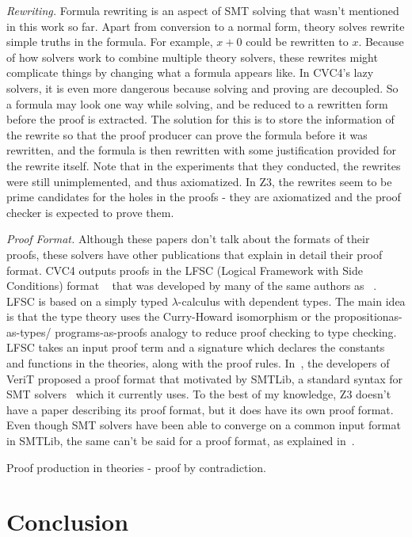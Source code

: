 \documentclass{article}
\begin{document}
\textit{Rewriting.} Formula rewriting is an aspect 
of SMT solving that wasn't mentioned in this work 
so far. Apart from conversion to a normal form, 
theory solves rewrite simple truths in the formula.
For example, $x + 0$ could be rewritten to $x$. 
Because of how solvers work to combine multiple 
theory solvers, these rewrites might complicate 
things by changing what a formula appears like. In CVC4's
lazy solvers, it is even more dangerous because 
solving and proving are decoupled. So a formula may 
look one way while solving, and be reduced to a 
rewritten form before the proof is extracted. The 
solution for this is to store the information of the 
rewrite so that the proof producer can prove the 
formula before it was rewritten, and the formula 
is then rewritten with some justification provided 
for the rewrite itself. Note that in the experiments 
that they conducted, the rewrites were still 
unimplemented, and thus axiomatized. In Z3, the 
rewrites seem to be prime candidates for the holes
in the proofs - they are axiomatized and the proof
checker is expected to prove them.

\textit{Proof Format.} Although these papers don't 
talk about the formats of their proofs, these solvers
have other publications that explain in detail their 
proof format. CVC4 outputs proofs in the LFSC 
(Logical Framework with Side Conditions) format 
~\cite{DBLP:journals/fmsd/StumpORHT13} that 
was developed by many of the same authors as 
~\cite{DBLP:conf/fmcad/KatzBTRH16}. LFSC is based on 
a simply typed $\lambda$-calculus with dependent types. 
The main idea is that the type theory uses the 
Curry-Howard isomorphism or the propositionas-as-types/
programs-as-proofs analogy to reduce 
proof checking to type checking. LFSC takes an 
input proof term and a signature which declares the 
constants and functions in the theories, along 
with the proof rules. In~\cite{Besson2011AFP}, the 
developers of VeriT proposed a proof format that 
motivated by SMTLib, a standard syntax for 
SMT solvers~\cite{BarFT-SMTLIB} which it 
currently uses. To the best of my knowledge, Z3 
doesn't have a paper describing its proof format, 
but it does have its own proof format. Even though 
SMT solvers have been able to converge on a common 
input format in SMTLib, the same can't be said for 
a proof format, as explained in~\cite{Fontaine2014ProofsIS}.


Proof production in theories - proof by contradiction.
\section{Conclusion}
\label{sec:conc}



\end{document}
